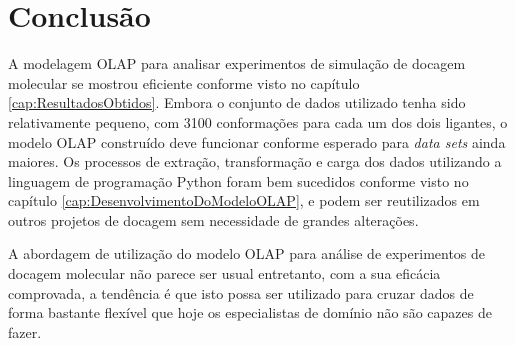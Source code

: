 \chapter{Conclusão}

A modelagem OLAP para analisar experimentos de simulação de docagem molecular se mostrou eficiente conforme visto no capítulo \ref{cap:ResultadosObtidos}. Embora o conjunto de dados utilizado tenha sido relativamente pequeno, com 3100 conformações para cada um dos dois ligantes, o modelo OLAP construído deve funcionar conforme esperado para \emph{data sets} ainda maiores. Os processos de extração, transformação e carga dos dados utilizando a linguagem de programação Python foram bem sucedidos conforme visto no capítulo \ref{cap:DesenvolvimentoDoModeloOLAP}, e podem ser reutilizados em outros projetos de docagem sem necessidade de grandes alterações. 

A abordagem de utilização do modelo OLAP para análise de experimentos de docagem molecular não parece ser usual entretanto, com a sua eficácia comprovada, a tendência é que isto possa ser utilizado para cruzar dados de forma bastante flexível que hoje os especialistas de domínio não são capazes de fazer.
